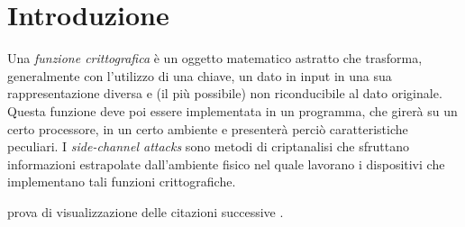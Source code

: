 \chapter{Introduzione}
	Una \emph{funzione crittografica} è un oggetto matematico astratto che trasforma, generalmente con l'utilizzo di una chiave, un dato in input in una sua rappresentazione diversa e (il più possibile) non riconducibile al dato originale. Questa funzione deve poi essere implementata in un programma, che girerà su un certo processore, in un certo ambiente e presenterà perciò caratteristiche peculiari. I \emph{side-channel attacks} sono metodi di criptanalisi che sfruttano informazioni estrapolate dall'ambiente fisico nel quale lavorano i dispositivi che implementano tali funzioni crittografiche\cite{canteaut2006understanding}\cite{standaert2010introduction}.
	
	prova di visualizzazione delle citazioni successive \cite{kocher2018spectre}.
